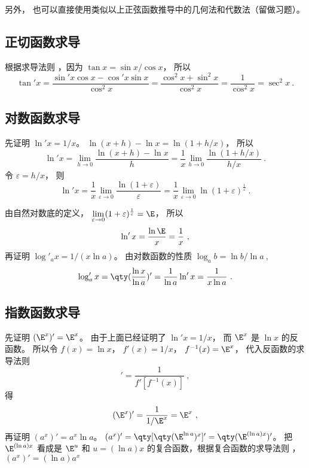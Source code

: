 另外， 也可以直接使用类似以上正弦函数推导中的几何法和代数法（留做习题）。

\subsection{正切函数求导}
根据求导法则%
，因为 $\tan x = \sin x/\cos x$， 所以
\begin{equation}
\tan' x = \frac{\sin' x \cos x - \cos' x\sin x}{\cos^2 x} = \frac{\cos^2x + \sin^2 x}{\cos^2 x} = \frac{1}{\cos ^2 x} = \sec ^2 x~.
\end{equation}

\subsection{对数函数求导}
先证明 $\ln' x = {1}/{x}$。  $\ln(x + h) - \ln x = \ln(1 + h/x)$， 所以
 \begin{equation}
\ln 'x = \lim_{h \to 0} \frac{\ln(x + h) - \ln x}{h} = \frac{1}{x} \lim_{h \to 0} \frac{\ln(1 + h/x)}{h/x}~.
\end{equation}
令 $\varepsilon  = h/x$， 则
\begin{equation}
\ln' x = \frac{1}{x} \lim_{\varepsilon  \to 0} \frac{\ln(1 + \varepsilon)}{\varepsilon } = \frac{1}{x} \lim_{\varepsilon  \to 0} \ln(1 + \varepsilon)^{\frac{1}{\varepsilon }} ~.
\end{equation}
 
由自然对数底的定义， $\lim\limits_{\varepsilon  \to 0} (1 + \varepsilon)^{\frac{1}{\varepsilon }} = \E$， 所以
 \begin{equation}
\ln 'x = \frac{\ln \E}{x} = \frac{1}{x}~,
\end{equation}
再证明 $\log'_a x = {1}/(x\ln a)$。 
由对数函数的性质 $\log_a b = \ln b/\ln a~,$
\begin{equation}
\log'_a x = \qty(\frac{\ln x}{\ln a})' = \frac{1}{\ln a}\ln' x = \frac{1}{x\ln a}~.
\end{equation}

\subsection{指数函数求导}
先证明 $(\E^x)' = \E^x$。 
由于上面已经证明了 $ \ln'x = 1/x$， 而 $\E^x$ 是 $\ln x$ 的反函数。 所以令 $f(x) = \ln x$， $f'(x) = 1/x$，  $f^{ - 1} (x) = \E^x$， 代入反函数的求导法则%
\begin{equation}
[f^{-1} (x)]' = \frac{1}{f'[f^{ - 1}(x)]}~,
\end{equation} 
得
\begin{equation}
(\E^x)' = \frac{1}{1/\E^x} = \E^x~,
\end{equation}
再证明 $(a^x)' = a^x \ln a$。  $(a^x)' = \qty[ \qty( \E^{\ln a} )^x ]' = \qty( \E^{(\ln a) x} )'$。 把 $\E^{(\ln a) x}$ 看成是 $\E^u$ 和 $u = (\ln a) x$ 的复合函数，根据复合函数的求导法则 ，$(a^x)' = (\ln a) a^x$ 

